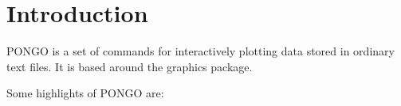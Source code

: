  \cleardoublepage
 \begin{latexonly}
   \setlength{\parskip}{0mm}
   \latexonlytoc
   \setlength{\parskip}{\medskipamount}
   \markboth{\stardocname}{\stardocname}
 \end{latexonly}
\cleardoublepage
\renewcommand{\thepage}{\arabic{page}}
\setcounter{page}{1}
\newpage

\section{Introduction}

PONGO is a set of commands for interactively plotting data stored
in ordinary text files.
It is based around the  graphics
package.

Some highlights of PONGO are:

